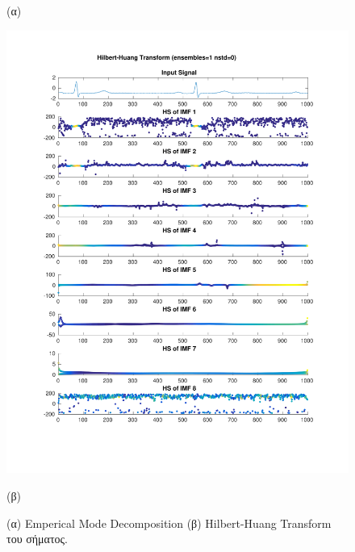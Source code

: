 \documentclass[11pt,a4paper]{article}
\begin{document}
\begin{figure}[H]
\begin{minipage}{0.48\textwidth}
	(α)
\end{minipage}
\begin{minipage}{0.48\textwidth}
	\centering
	\includegraphics[width=\textwidth]{fig/123l1_hht.pdf}
	
	(β)
\end{minipage}
\vfill
\caption{(α) Emperical Mode Decomposition (β) Hilbert-Huang Transform του σήματος.}
\label{fig:123l1_hht}
\end{figure}
\end{document}
